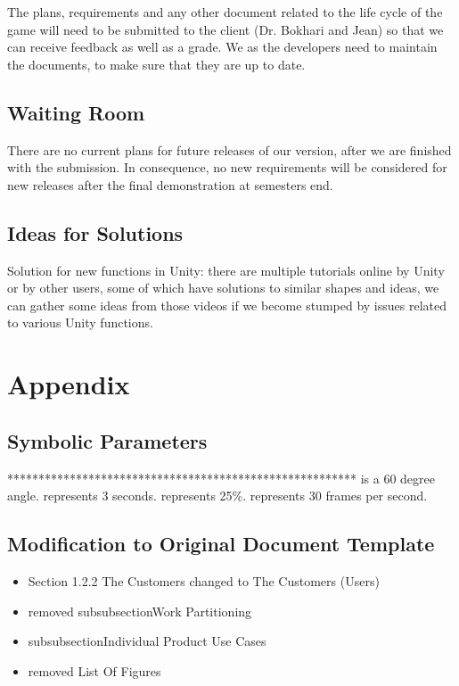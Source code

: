 \documentclass[12pt, titlepage]{article}
\begin{document}
The plans, requirements and any other document related to the life cycle of the game will need to be submitted to the client (Dr. Bokhari and Jean) so that we can receive feedback as well as a grade. We as the developers need to maintain the documents, to make sure that they are up to date.


\subsection{Waiting Room}
There are no current plans for future releases of our version, after we are finished with the submission. In consequence, no new requirements will be considered for new releases after the final demonstration at semesters end. 

\subsection{Ideas for Solutions} 
Solution for new functions in Unity: there are multiple tutorials online by Unity or by other users, some of which have solutions to similar shapes and ideas, we can gather some ideas from those videos if we become stumped by issues related to various Unity functions. 


\newpage

\section{Appendix}

\subsection{Symbolic Parameters}
********************************************************
\newline
\textepsilon \space is a 60 degree angle. 
\newline
\textdelta  \space represents 3 seconds.
\newline
\textalpha \space  represents 25\%.
\newline
\textgamma \space represents 30 frames per second.



\subsection{Modification to Original Document Template}
\begin{itemize}
\item Section 1.2.2 The Customers changed to The Customers (Users)
\item removed subsubsection{Work Partitioning}
\item subsubsection{Individual Product Use Cases}
\item removed List Of Figures
\end{itemize}
\end{document}
